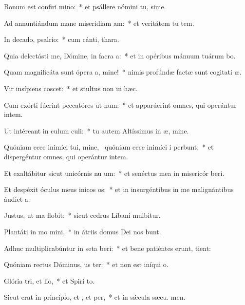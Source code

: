 \item Bonum est confiri mino:~* et psállere nómini tu, sime.
\item Ad annuntiándum mane miseridiam am:~* et veritátem tu  tem.
\item In decado, psalrio:~* cum cánti,  thara.
\item Quia delectásti me, Dómine, in facra a:~* et in opéribus mánuum tuárum bo.
\item Quam magnificáta sunt ópera a, mine!~* nimis profúndæ factæ sunt cogitati æ.
\item Vir insípiens  coscet:~* et stultus non in hæc.
\item Cum exórti fúerint peccatóres ut num:~* et apparúerint omnes, qui operántur intem.
\item Ut intéreant in culum culi:~* tu autem Altíssimus in æ, mine.
\item Quóniam ecce inimíci tui, mine,~\pscross{} quóniam ecce inimíci i perbunt:~* et dispergéntur omnes, qui operántur intem.
\item Et exaltábitur sicut unicórnis nu um:~* et senéctus mea in misericór beri.
\item Et despéxit óculus meus inicos os:~* et in insurgéntibus in me malignántibus áudiet  a.
\item Justus, ut ma flobit:~* sicut cedrus Líbani mulbitur.
\item Plantáti in mo mini,~* in átriis domus Dei nos bunt.
\item Adhuc multiplicabúntur in seta beri:~* et bene patiéntes erunt,  tient:
\item Quóniam rectus Dóminus, us ter:~* et non est iníqui  o.
\item Glória tri, et lio,~* et Spirí to.
\item Sicut erat in princípio, et , et per,~* et in sǽcula sæcu. men.
